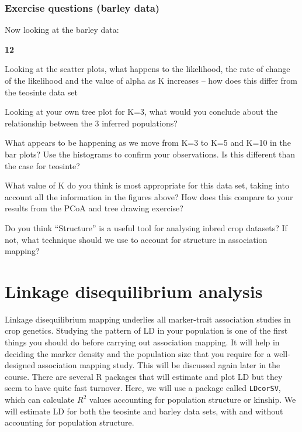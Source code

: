 \documentclass[
]{book}
\makeatletter
\newenvironment{kframe}{%
\medskip{}
\setlength{\fboxsep}{.8em}
 \def\at@end@of@kframe{}%
 \ifinner\ifhmode%
  \def\at@end@of@kframe{\end{minipage}}%
  \begin{minipage}{\columnwidth}%
 \fi\fi%
 \def\FrameCommand##1{\hskip\@totalleftmargin \hskip-\fboxsep
 \colorbox{shadecolor}{##1}\hskip-\fboxsep
     \hskip-\linewidth \hskip-\@totalleftmargin \hskip\columnwidth}%
 \MakeFramed {\advance\hsize-\width
   \@totalleftmargin\z@ \linewidth\hsize
   \@setminipage}}%
 {\par\unskip\endMakeFramed%
 \at@end@of@kframe}
\newenvironment{rmdblock}[1]
  {
  \begin{itemize}
  \renewcommand{\labelitemi}{
    \raisebox{-.7\height}[0pt][0pt]{
      {\setkeys{Gin}{width=3em,keepaspectratio}\texttt{[image: images/\#1]}}
    }
  }
  \setlength{\fboxsep}{1em}
  \begin{kframe}
  \item
  }
  {
  \end{kframe}
  \end{itemize}
  }
\newenvironment{rmdquiz}
  {\begin{rmdblock}{quiz}}
  {\end{rmdblock}}
\makeatother
\begin{document}
\hypertarget{exercise-questions-barley-data}{%
\subsubsection{Exercise questions (barley data)}\label{exercise-questions-barley-data}}

Now looking at the barley data:

\begin{rmdquiz}
\textbf{12}

Looking at the scatter plots, what happens to the likelihood, the rate of change of the likelihood and the value of alpha as K increases -- how does this differ from the teosinte data set

Looking at your own tree plot for K=3, what would you conclude about the relationship between the 3 inferred populations?

What appears to be happening as we move from K=3 to K=5 and K=10 in the bar plots? Use the histograms to confirm your observations. Is this different than the case for teosinte?

What value of K do you think is most appropriate for this data set, taking into account all the information in the figures above? How does this compare to your results from the PCoA and tree drawing exercise?

Do you think ``Structure'' is a useful tool for analysing inbred crop datasets? If not, what technique should we use to account for structure in association mapping?
\end{rmdquiz}

\hypertarget{linkage-disequilibrium-analysis}{%
\section{Linkage disequilibrium analysis}\label{linkage-disequilibrium-analysis}}

Linkage disequilibrium mapping underlies all marker-trait association studies in crop genetics. Studying the pattern of LD in your population is one of the first things you should do before carrying out association mapping. It will help in deciding the marker density and the population size that you require for a well-designed association mapping study. This will be discussed again later in the course. There are several R packages that will estimate and plot LD but they seem to have quite fast turnover. Here, we will use a package called \texttt{LDcorSV}, which can calculate \(R^2\) values accounting for population structure or kinship. We will estimate LD for both the teosinte and barley data sets, with and without accounting for population structure.
\end{document}
